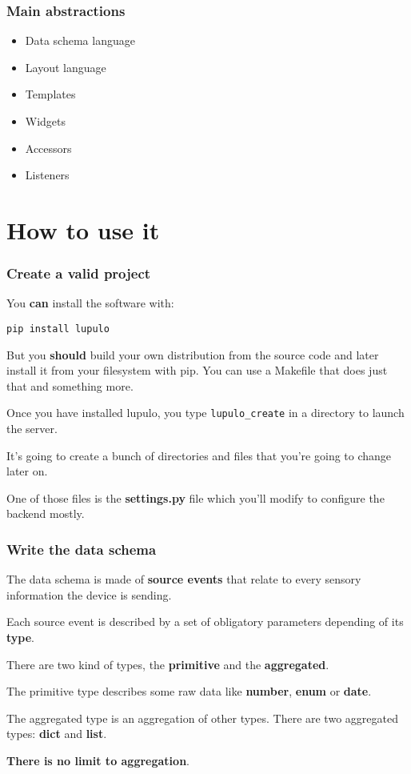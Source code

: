 \documentclass{beamer}
\begin{document}
    \begin{frame}
        \frametitle{Main abstractions}
        \begin{itemize}
            \item Data schema language
            \item Layout language
            \item Templates
            \item Widgets
            \item Accessors
            \item Listeners
        \end{itemize}
    \end{frame}

    \section{How to use it}
    \begin{frame}
        \frametitle{Create a valid project}
        You \textbf{can} install the software with:
            
        \texttt{pip install lupulo}

        But you \textbf{should} build your own distribution from the source 
        code and later install it from your filesystem with pip. You can use a 
        Makefile that does just that and something more.

        \vspace{0.5cm}

        Once you have installed lupulo, you type \texttt{lupulo\_create} in a
        directory to launch the server.

        It's going to create a bunch of directories and files that you're going
        to change later on.

        One of those files is the \textbf{settings.py} file which you'll modify
        to configure the backend mostly.
    \end{frame}

    \begin{frame}
        \frametitle{Write the data schema}

        The data schema is made of \textbf{source events} that relate to every
        sensory information the device is sending.

        Each source event is described by a set of obligatory parameters
        depending of its \textbf{type}.

        There are two kind of types, the \textbf{primitive} and the
        \textbf{aggregated}.

        The primitive type describes some raw data like \textbf{number}, 
        \textbf{enum} or \textbf{date}.

        The aggregated type is an aggregation of other types. There are two
        aggregated types: \textbf{dict} and \textbf{list}.

        \textbf{There is no limit to aggregation}.
    \end{frame}
\end{document}
